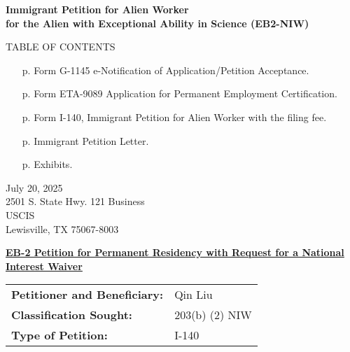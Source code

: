 \documentclass{article}
\begin{document}
\vspace*{\fill}
\begin{center}

{\bf 
Immigrant Petition for Alien Worker\\
for the Alien with Exceptional Ability in Science (EB2-NIW)
}

\end{center}
\vspace*{\fill}

\begin{center}
TABLE OF CONTENTS
\end{center}
\begin{itemize}
    \item [p. \pageref*{G-1145}] Form G-1145 e-Notification of Application/Petition Acceptance. 
    \item [p. \pageref*{ETA-9089}] Form ETA-9089 Application for Permanent Employment Certification. 
        
    \item [p. \pageref*{I-140}] Form I-140, Immigrant Petition for Alien Worker with the filing fee.
    \item [p. \pageref*{petition}] Immigrant Petition Letter.
    \item [p. \pageref*{exhib}] Exhibits.
\end{itemize}

\clearpage
\label{G-1145}


\label{ETA-9089}



\label{I-140}


\clearpage
July 20, 2025
\label{petition}
\\
2501 S. State Hwy. 121 Business\\
USCIS\\
Lewisville, TX 75067-8003

\underline{\bf EB-2 Petition for Permanent Residency with Request for a National Interest Waiver}

\begin{tabular}{ll}
{\bf Petitioner and Beneficiary:} & Qin Liu \\
{\bf Classification Sought:} & 203(b) (2) NIW\\
{\bf Type of Petition:} & I-140
\end{tabular}
\vspace{2\baselineskip}
\end{document}
